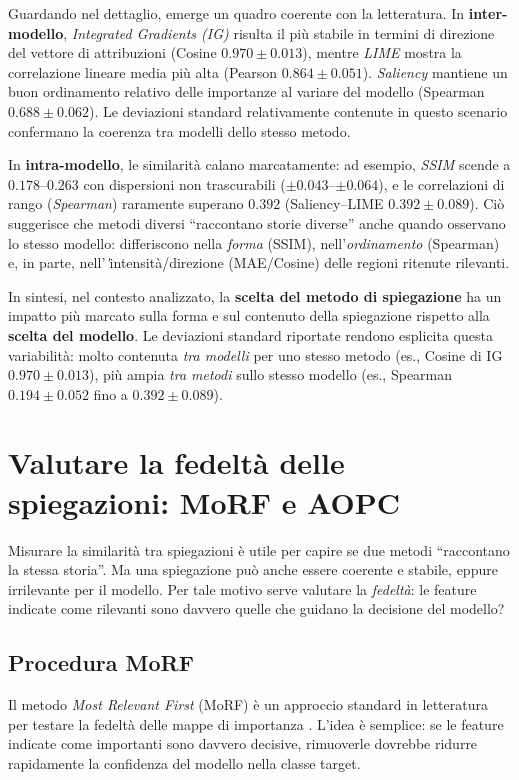 \documentclass[12pt,a4paper,oneside]{report}
\numberwithin{figure}{chapter}
\numberwithin{table}{chapter}
\begin{document}
Guardando nel dettaglio, emerge un quadro coerente con la letteratura. In
\textbf{inter-modello}, \emph{Integrated Gradients (IG)} risulta il più stabile
in termini di direzione del vettore di attribuzioni (Cosine $0.970 \pm 0.013$),
mentre \emph{LIME} mostra la correlazione lineare media più alta (Pearson
$0.864 \pm 0.051$). \emph{Saliency} mantiene un buon ordinamento relativo delle
importanze al variare del modello (Spearman $0.688 \pm 0.062$). Le deviazioni
standard relativamente contenute in questo scenario confermano la coerenza tra
modelli dello stesso metodo.

In \textbf{intra-modello}, le similarità calano marcatamente: ad esempio,
\emph{SSIM} scende a $0.178$--$0.263$ con dispersioni non trascurabili ($\pm
      0.043$--$\pm 0.064$), e le correlazioni di rango (\emph{Spearman}) raramente
superano $0.392$ (Saliency--LIME $0.392 \pm 0.089$). Ciò suggerisce che metodi
diversi “raccontano storie diverse” anche quando osservano lo stesso modello:
differiscono nella \emph{forma} (SSIM), nell’\emph{ordinamento} (Spearman) e,
in parte, nell'\emph'{intensità/direzione} (MAE/Cosine) delle regioni ritenute
rilevanti.

In sintesi, nel contesto analizzato, la \textbf{scelta del metodo di
      spiegazione} ha un impatto più marcato sulla forma e sul contenuto della
spiegazione rispetto alla \textbf{scelta del modello}. Le deviazioni standard
riportate rendono esplicita questa variabilità: molto contenuta \emph{tra
      modelli} per uno stesso metodo (es., Cosine di IG $0.970 \pm 0.013$), più ampia
\emph{tra metodi} sullo stesso modello (es., Spearman $0.194 \pm 0.052$ fino a
$0.392 \pm 0.089$).

\chapter{Valutare la fedeltà delle spiegazioni: MoRF e AOPC}

Misurare la similarità tra spiegazioni è utile per capire se due metodi
``raccontano la stessa storia''. Ma una spiegazione può anche essere coerente e
stabile, eppure irrilevante per il modello. Per tale motivo serve valutare la
\emph{fedeltà}: le feature indicate come rilevanti sono davvero quelle che
guidano la decisione del modello?

\section{Procedura MoRF}
Il metodo \emph{Most Relevant First} (MoRF) è un approccio standard in
letteratura per testare la fedeltà delle mappe di importanza
\citep{samek2016evaluating,samek2017explainable}. L’idea è semplice: se le
feature indicate come importanti sono davvero decisive, rimuoverle dovrebbe
ridurre rapidamente la confidenza del modello nella classe target.
\end{document}
